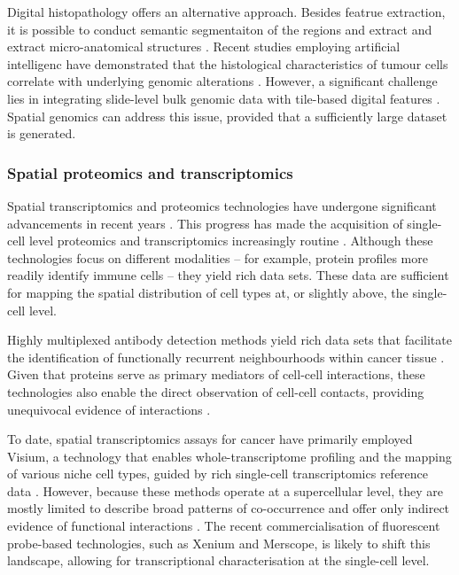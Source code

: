 Digital histopathology offers an alternative approach. Besides featrue extraction, it is possible to conduct semantic segmentaiton of the regions and extract and extract micro-anatomical structures \parencite{Kiemen2020-dc}. Recent studies employing artificial intelligenc have demonstrated that the histological characteristics of tumour cells correlate with underlying genomic alterations \parencite{Fu2020-cp, Kather2020-bt}. However, a significant challenge lies in integrating slide-level bulk genomic data with tile-based digital features \parencite{Shmatko2022-to}. Spatial genomics can address this issue, provided that a sufficiently large dataset is generated.

\subsubsection*{Spatial proteomics and transcriptomics}

Spatial transcriptomics and proteomics technologies have undergone significant advancements in recent years \parencite{Lewis2021-ic, Mund2022-kf}. This progress has made the acquisition of single-cell level proteomics and transcriptomics increasingly routine . Although these technologies focus on different modalities -- for example, protein profiles more readily identify immune cells -- they yield rich data sets. These data are sufficient for mapping the spatial distribution of cell types at, or slightly above, the single-cell level.

Highly multiplexed antibody detection methods yield rich data sets that facilitate the identification of functionally recurrent neighbourhoods within cancer tissue \parencite{Danenberg2022-zb, Jackson2020-em, Nirmal2022-sq, Schurch2020-lp, Wang2023-bo}. Given that proteins serve as primary mediators of cell-cell interactions, these technologies also enable the direct observation of cell-cell contacts, providing unequivocal evidence of interactions \parencite{Nirmal2022-sq, Wang2023-bo}.

To date, spatial transcriptomics assays for cancer have primarily employed \ac{Visium}, a technology that enables whole-transcriptome profiling and the mapping of various niche cell types, guided by rich single-cell transcriptomics reference data \parencite{Andersson2021-pu, Stahl2016-nq, Wu2021-uq, Berglund2018-gh, Moncada2020-ck, Qi2022-by, Ji2020-gn, Ravi2022-ut, Wu2021-wb, Gouin2021-zx, Barkley2022-gx, Erickson2022-zh}. However, because these methods operate at a supercellular level, they are mostly limited to describe broad patterns of co-occurrence and offer only indirect evidence of functional interactions . The recent commercialisation of fluorescent probe-based technologies, such as \ac{Xenium} and \ac{Merscope}, is likely to shift this landscape, allowing for transcriptional characterisation at the single-cell level.

